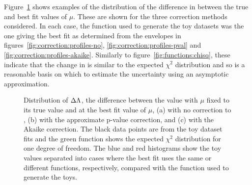 Figure~\ref{fig:correction:chisq} shows examples of
the distribution of the difference
in \nll between the true and best fit values of $\mu$. These are shown for the
three correction methods considered. In each case, the function used to generate
the toy datasets was the one giving the best fit as determined from the 
envelopes in figures~\ref{fig:correction:profiles-no}, 
\ref{fig:correction:profiles-pval} and
\ref{fig:correction:profiles-akaike}.
Similarly to figure~\ref{fig:functions:chisq}, these indicate that the
change in \nll is similar to the expected $\chi^2$ distribution and so
is a reasonable basis on which to estimate the uncertainty using an
asymptotic approximation.
%
\begin{figure}[tbp]
\centering
\caption{Distribution of  $\Delta\Lambda$, the difference
between the \nll value with $\mu$ fixed to its true value and \nll at the best fit value
of $\mu$, (a) with no correction to \nll, (b) with the approximate p-value
correction, and (c) with the Akaike correction.
The black data points are from the toy dataset fits and the green function
shows the expected $\chi^2$ distribution for one degree of freedom.
The blue and red histograms show the toy values separated into
cases where the best fit uses the same or different functions, respectively, compared with the function used to generate the toys.}
\label{fig:correction:chisq}
\end{figure}


